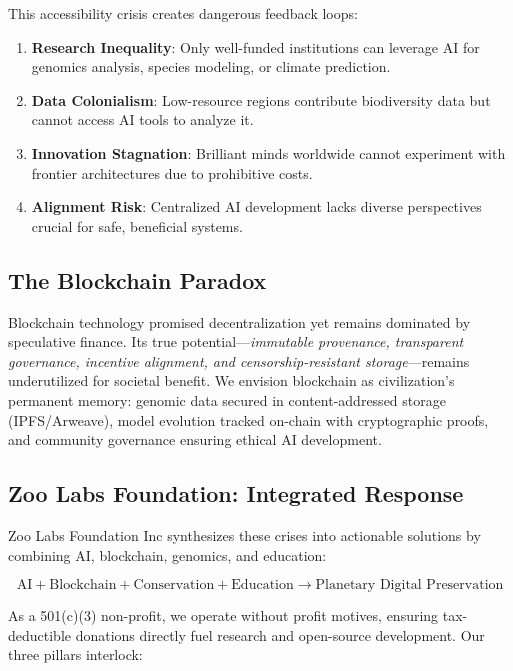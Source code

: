 This accessibility crisis creates dangerous feedback loops:
\begin{enumerate}
    \item \textbf{Research Inequality}: Only well-funded institutions can leverage AI for genomics analysis, species modeling, or climate prediction.
    \item \textbf{Data Colonialism}: Low-resource regions contribute biodiversity data but cannot access AI tools to analyze it.
    \item \textbf{Innovation Stagnation}: Brilliant minds worldwide cannot experiment with frontier architectures due to prohibitive costs.
    \item \textbf{Alignment Risk}: Centralized AI development lacks diverse perspectives crucial for safe, beneficial systems.
\end{enumerate}

\subsection{The Blockchain Paradox}

Blockchain technology promised decentralization yet remains dominated by speculative finance. Its true potential—\textit{immutable provenance, transparent governance, incentive alignment, and censorship-resistant storage}—remains underutilized for societal benefit. We envision blockchain as civilization's permanent memory: genomic data secured in content-addressed storage (IPFS/Arweave), model evolution tracked on-chain with cryptographic proofs, and community governance ensuring ethical AI development.

\subsection{Zoo Labs Foundation: Integrated Response}

Zoo Labs Foundation Inc synthesizes these crises into actionable solutions by combining AI, blockchain, genomics, and education:

\begin{equation}
\text{AI} + \text{Blockchain} + \text{Conservation} + \text{Education} \rightarrow \text{Planetary Digital Preservation}
\end{equation}

As a 501(c)(3) non-profit, we operate without profit motives, ensuring tax-deductible donations directly fuel research and open-source development. Our three pillars interlock:

